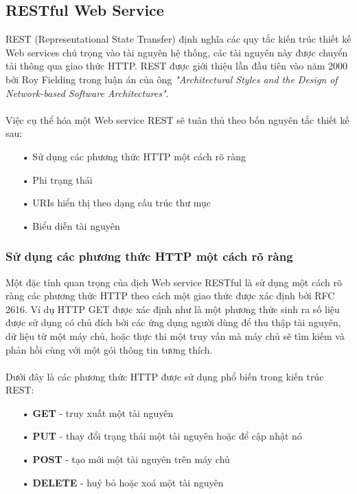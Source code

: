 \documentclass[a4paper]{article}
\begin{document}
\subsection{RESTful Web Service}
REST (Representational State Transfer) định nghĩa các quy tắc kiến trúc thiết kế Web services chú trọng vào tài nguyên hệ thống, các tài nguyên này được chuyển tải thông qua giao thức HTTP. REST được giới thiệu lần đầu tiên vào năm 2000 bởi Roy Fielding trong luận án của ông \textit{"Architectural Styles and the Design of Network-based Software Architectures"}.\\
\\
Việc cụ thể hóa một Web service REST sẽ tuân thủ theo bốn nguyên tắc thiết kế sau: \cite{bib11}
 \begin{itemize}
 	\item[•]Sử dụng các phương thức HTTP một cách rõ ràng
	\item[•]Phi trạng thái
	\item[•]URIs hiển thị theo dạng cấu trúc thư mục
	\item[•]Biểu diễn tài nguyên 
 \end{itemize}
\subsubsection{Sử dụng các phương thức HTTP một cách rõ ràng}
Một đặc tính quan trọng của dịch Web service RESTful là sử dụng một cách rõ ràng các phương thức HTTP theo cách một giao thức được xác định bởi RFC 2616. Ví dụ HTTP GET được xác định như là một phương thức sinh ra số liệu được sử dụng có chủ đích bởi các ứng dụng người dùng để thu thập tài nguyên, dữ liệu từ một máy chủ, hoặc thực thi một truy vấn mà máy chủ sẽ tìm kiếm và phản hồi cùng với một gói thông tin tương thích.\\
\\
Dưới đây là các phương thức HTTP được sử dụng phổ biến trong kiến trúc REST:
\begin{itemize}
\item[•]\textbf{GET} - truy xuất một tài nguyên 
\item[•]\textbf{PUT} - thay đổi trạng thái một tài nguyên hoặc để cập nhật nó
\item[•]\textbf{POST} - tạo mới một tài nguyên trên máy chủ
\item[•]\textbf{DELETE} - huỷ bỏ hoặc xoá một tài nguyên
\end{itemize}
\end{document}
